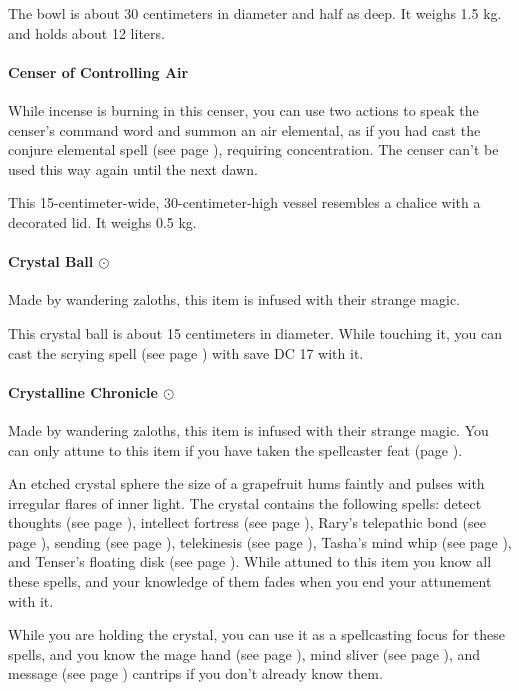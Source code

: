         The bowl is about 30 centimeters in diameter and half as deep.
        It weighs 1.5 kg. and holds about 12 liters.
    \paragraph{Censer of Controlling Air}
        While incense is burning in this censer, you can use two actions to speak the censer's command word and summon an air elemental, as if you had cast the conjure elemental spell (see page \pageref{spell::conjureelemental}), requiring concentration.
        The censer can't be used this way again until the next dawn.

        This 15-centimeter-wide, 30-centimeter-high vessel resembles a chalice with a decorated lid.
        It weighs 0.5 kg.
    \paragraph{Crystal Ball $\odot$}
        Made by wandering zaloths, this item is infused with their strange magic.

        This crystal ball is about 15 centimeters in diameter.
        While touching it, you can cast the scrying spell (see page \pageref{spell::scrying}) with save DC 17 with it.
    \paragraph{Crystalline Chronicle $\odot$}
        Made by wandering zaloths, this item is infused with their strange magic.
        You can only attune to this item if you have taken the spellcaster feat (page \pageref{feat::spellcaster}).

        An etched crystal sphere the size of a grapefruit hums faintly and pulses with irregular flares of inner light.
        The crystal contains the following spells: detect thoughts (see page \pageref{spell::detectthoughts}), intellect fortress (see page \pageref{spell::intellectfortress}), Rary's telepathic bond (see page \pageref{spell::rarystelepathicbond}), sending (see page \pageref{spell::sending}), telekinesis (see page \pageref{spell::telekinesis}), Tasha's mind whip (see page \pageref{spell::tashasmindwhip}), and Tenser's floating disk (see page \pageref{spell::tensersfloatingdisc}).
        While attuned to this item you know all these spells, and your knowledge of them fades when you end your attunement with it.

        While you are holding the crystal, you can use it as a spellcasting focus for these spells, and you know the mage hand (see page \pageref{spell::magehand}), mind sliver (see page \pageref{spell::mindsliver}), and message (see page \pageref{spell::message}) cantrips if you don't already know them.


